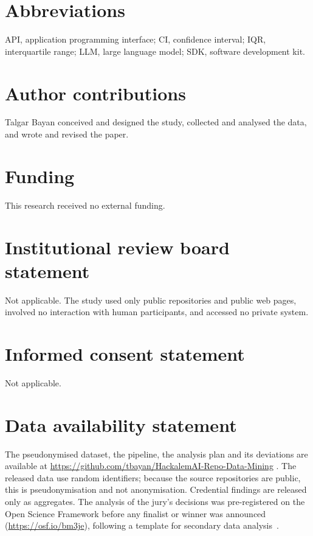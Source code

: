 \documentclass{article}
\begin{document}
\section*{Abbreviations}
API, application programming interface; CI, confidence interval; IQR, interquartile range; LLM, large language model; SDK, software development kit.

\section*{Author contributions}
Talgar Bayan conceived and designed the study, collected and analysed the data, and wrote and revised the paper.

\section*{Funding}
This research received no external funding.

\section*{Institutional review board statement}
Not applicable. The study used only public repositories and public web pages, involved no interaction with human participants, and accessed no private system.

\section*{Informed consent statement}
Not applicable.

\section*{Data availability statement}
The pseudonymised dataset, the pipeline, the analysis plan and its deviations are available at \url{https://github.com/tbayan/HackalemAI-Repo-Data-Mining} . The released data use random identifiers; because the source repositories are public, this is pseudonymisation and not anonymisation. Credential findings are released only as aggregates. The analysis of the jury's decisions was pre-registered on the Open Science Framework before any finalist or winner was announced (\url{https://osf.io/bm3je}), following a template for secondary data analysis~\cite{vandenakker2021prereg}.
\end{document}
